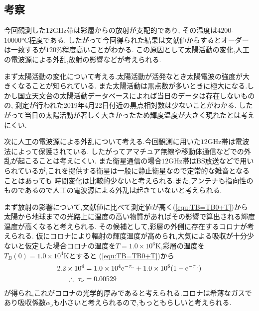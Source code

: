 \subsection{考察}
今回観測した$12\si{\giga\hertz}$帯は彩層からの放射が支配的であり,
その温度は$4200$-$10000\si{\celsius}$程度である.\cite{saiso:online}
したがって今回得られた結果は文献値からするとオーダーは一致するが$120\%$程度高いことがわかる.
この原因として太陽活動の変化,人工の電波源による外乱,放射の影響などが考えられる.

まず太陽活動の変化について考える.太陽活動が活発なとき太陽電波の強度が大きくなることが知られている.\cite{naze:online}
また太陽活動は黒点数が多いときに極大になる.しかし国立天文台の太陽活動データベースによれば当日のデータは存在しないものの,
測定が行われた2019年4月22日付近の黒点相対数は少ないことがわかる.\cite{nao:online}
したがって当日の太陽活動が著しく大きかったため輝度温度が大きく現れたとは考えにくい.

次に人工の電波源による外乱について考える.今回観測に用いた$12\si{\giga\hertz}$帯は電波法によって保護されている.\cite{12ghz:online}
したがってアマチュア無線や移動体通信などでの外乱が起こることは考えにくい.
また衛星通信の場合$12\si{\giga\hertz}$帯はBS放送などで用いられているが,これを提供する衛星は一般に静止衛星なので定常的な雑音となることはあっても
時間変化は比較的少ないと考えられる.また,アンテナも指向性のものであるので人工の電波源による外乱は起きていないと考えられる.

まず放射の影響について,文献値に比べて測定値が高く(\ref{equ:TB=TB0+T})から
太陽から地球までの光路上に温度の高い物質があればその影響で算出される輝度温度が高くなると考えられる.
その候補として,彩層の外側に存在するコロナが考えられる.
仮にコロナにより輻射の輝度温度が高められ,大気による吸収が十分少ないと仮定した場合コロナの温度を$T=1.0\times10^6\si{\kelvin}$,彩層の温度を$T_B(0)=1.0\times10^4\si{\kelvin}$とすると
(\ref{equ:TB=TB0+T})から
\begin{align}
  2.2\times10^4&=1.0\times10^4{\rm e}^{-\tau_\nu}+1.0\times10^6(1-{\rm e}^{-\tau_\nu})\nonumber\\
  \therefore\ \tau_\nu&=0.00529
\end{align}
が得られ,これがコロナの光学的厚みであると考えられる.コロナは希薄なガスであり吸収係数$\alpha_\nu$も小さいと考えられるので,もっともらしいと考えられる.
